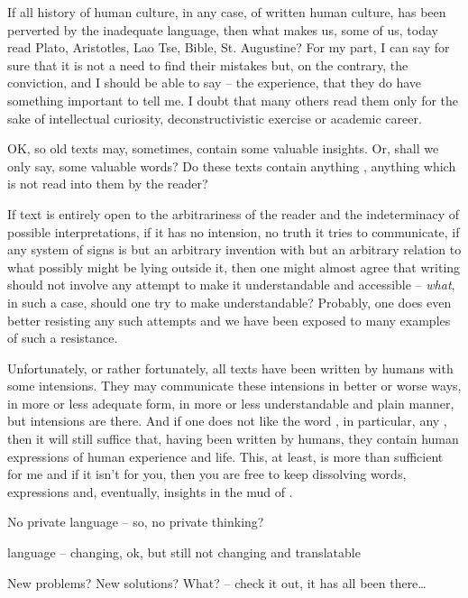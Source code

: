 {\pa If all history of human culture, in any case, of written human
culture, has been perverted by the inadequate language, then what
makes us, some of us, today read Plato, Aristotles, Lao Tse, Bible,
St.  Augustine?  For my part, I can say for sure that it is not a need
to find their mistakes but, on the contrary, the conviction, and I
should be able to say -- the experience, that they do have something
important to tell me.  I doubt that many others read them only for the
sake of intellectual curiosity, deconstructivistic exercise or
academic career.

\pa
OK, so old texts may, sometimes, contain some valuable insights. Or, 
shall we only say, some valuable words? Do these texts contain 
anything , anything which is not read into them by 
the reader?

If text is entirely open to the arbitrariness of the reader and the
indeterminacy of possible interpretations, if it has no intension, no
truth it tries to communicate, if any system of signs is but an 
arbitrary invention with but an arbitrary relation to what possibly 
might be lying outside it, then one might almost agree that
writing should not involve any attempt to make it understandable and
accessible -- {\em what}, in such a case, should one try to make 
understandable?  Probably, one does even better resisting any such
attempts and we have been exposed to many examples of such a 
resistance. 

Unfortunately, or rather fortunately, all texts have been written by 
humans with some intensions. They may communicate these intensions in 
better or worse ways, in more or less adequate form, in more or less 
understandable and plain manner, but intensions are there. And if one 
does not like the word , in particular, any 
, then it will still suffice that, having been 
written by humans, they contain human expressions of human experience 
and life. This, at least, is more than sufficient for me and if it 
isn't for you, then you are free to keep dissolving words, expressions 
and, eventually, insights in the mud of .



No private language -- so, no private thinking?

language -- changing, ok, but still not changing and translatable

New problems? New solutions? What? -- check it out, it has all been 
there\ldots

}
